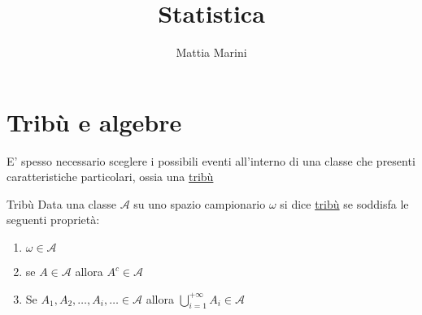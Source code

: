 \endofdump

\usetikzlibrary{external}
\usetikzlibrary{patterns}
\usepackage[outline]{contour}
\tikzexternalize[prefix=tikz/]

\title{Statistica}
\author{Mattia Marini}


\maketitle
\tableofcontents
\listofdefs
\listoftheorems

\newpage
\section{Tribù e algebre}
E' spesso necessario sceglere i possibili eventi all'interno di una classe che presenti caratteristiche particolari, ossia una \underline{tribù}
\begin{definizione}{Tribù}
	Data una classe $ \mathcal{A} $ su uno spazio campionario $ \omega  $ si dice \underline{tribù} se soddisfa le seguenti proprietà:
	\begin{enumerate}
		\item $ \omega \in \mathcal{A}$
		\item se $ A \in  \mathcal{A} $ allora $ A^{c} \in  \mathcal{A} $
		\item Se $ A_1, A_2,\ldots,A_i, \ldots \in \mathcal{A} $ allora $ \bigcup_{i=1}^{+ \infty }A_i \in \mathcal{A} $
	\end{enumerate}
\end{definizione}

